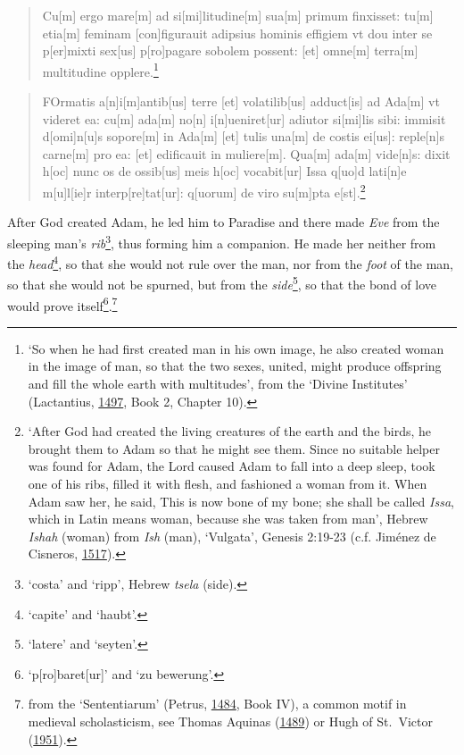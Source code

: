 \documentclass[
]{article}
\begin{document}
\begin{quote}
Cu{[}m{]} ergo mare{[}m{]} ad si{[}mi{]}litudine{[}m{]} sua{[}m{]}
primum finxisset: tu{[}m{]} etia{[}m{]} feminam {[}con{]}figurauit
adipsius hominis effigiem vt dou inter se p{[}er{]}mixti sex{[}us{]}
p{[}ro{]}pagare sobolem possent: {[}et{]} omne{[}m{]} terra{[}m{]}
multitudine opplere.\footnote{`So when he had first created man in his
  own image, he also created woman in the image of man, so that the two
  sexes, united, might produce offspring and fill the whole earth with
  multitudes', from the `Divine Institutes' (Lactantius,
  \href{https://books.google.com/books?id=qGsnghsi3uUC}{1497}, Book 2,
  Chapter 10).}
\end{quote}

\begin{quote}
FOrmatis a{[}n{]}i{[}m{]}antib{[}us{]} terre {[}et{]} volatilib{[}us{]}
adduct{[}is{]} ad Ada{[}m{]} vt videret ea: cu{[}m{]} ada{[}m{]}
no{[}n{]} i{[}n{]}ueniret{[}ur{]} adiutor si{[}mi{]}lis sibi: immisit
d{[}omi{]}n{[}u{]}s sopore{[}m{]} in Ada{[}m{]} {[}et{]} tulis
una{[}m{]} de costis ei{[}us{]}: reple{[}n{]}s carne{[}m{]} pro ea:
{[}et{]} edificauit in muliere{[}m{]}. Qua{[}m{]} ada{[}m{]}
vide{[}n{]}s: dixit h{[}oc{]} nunc os de ossib{[}us{]} meis h{[}oc{]}
vocabit{[}ur{]} Issa q{[}uo{]}d lati{[}n{]}e m{[}u{]}l{[}ie{]}r
interp{[}re{]}tat{[}ur{]}: q{[}uorum{]} de viro su{[}m{]}pta
e{[}st{]}.\footnote{`After God had created the living creatures of the
  earth and the birds, he brought them to Adam so that he might see
  them. Since no suitable helper was found for Adam, the Lord caused
  Adam to fall into a deep sleep, took one of his ribs, filled it with
  flesh, and fashioned a woman from it. When Adam saw her, he said, This
  is now bone of my bone; she shall be called \emph{Issa}, which in
  Latin means woman, because she was taken from man', Hebrew
  \emph{Ishah} (woman) from \emph{Ish} (man), `Vulgata', Genesis 2:19-23
  (c.f. Jiménez de Cisneros,
  \href{https://doi.org/10.3931/e-rara-46695}{1517}).}
\end{quote}

After God created Adam, he led him to Paradise and there made \emph{Eve}
from the sleeping man's \emph{rib}\footnote{`costa' and `ripp', Hebrew
  \emph{tsela} (side).}, thus forming him a companion. He made her
neither from the \emph{head}\footnote{`capite' and `haubt'.}, so that
she would not rule over the man, nor from the \emph{foot} of the man, so
that she would not be spurned, but from the \emph{side}\footnote{`latere'
  and `seyten'.}, so that the bond of love would prove
itself\footnote{`p{[}ro{]}baret{[}ur{]}' and `zu bewerung'.}.\footnote{from
  the `Sententiarum' (Petrus,
  \href{https://doi.org/10.3931/e-rara-18241}{1484}, Book IV), a common
  motif in medieval scholasticism, see Thomas Aquinas
  (\href{https://doi.org/10.3931/e-rara-15170}{1489}) or Hugh of
  St.~Victor
  (\href{https://archive.org/details/hugh-of-st.-victor-roy-j.-deferrari-on-the-sacraments-of-the-christian-faith-de-/mode/1up}{1951}).}
\end{document}
